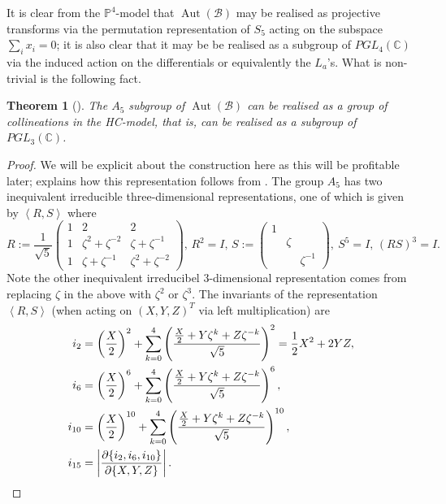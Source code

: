 \documentclass{amsart}
\newtheorem{theorem}{Theorem}[section]
\DeclareMathOperator{\Aut}{Aut}
\newcommand{\pround}[1]{\left( #1 \right)}
\newcommand{\pangle}[1]{\left\langle #1 \right\rangle}
\begin{document}
It is clear from the $\mathbb{P}^4$-model that $\Aut(\mathcal{B})$ may be realised as projective transforms via the permutation representation of $S_5$ acting on the subspace $\sum_i x_i = 0$; it is also clear that it may be  be realised as a subgroup of $PGL_4(\mathbb{C})$ via the induced action on the differentials or equivalently the $L_a$'s. What is non-trivial is the following fact.
\begin{theorem}[\cite{Dye1995}]\label{autA5}
The $A_5$ subgroup of $\Aut(\mathcal{B})$ can be realised as a group of collineations in the HC-model, that is, can be realised as a subgroup of $PGL_3(\mathbb{C})$.
\end{theorem}
\begin{proof}
We will be explicit about the construction here as this will be profitable later; \cite{Braden2012} explains how this representation follows from \cite{Dye1995}. The group $A_5$ has two inequivalent irreducible three-dimensional representations, one of which is given by $\pangle{R, S}$ where 
$$
R:=\frac1{\sqrt5}\begin{pmatrix}
    1 & 2                 & 2 \\
    1 & \zeta^2+\zeta^{-2}&\zeta+\zeta^{-1}  \\
    1 & \zeta+\zeta^{-1}  & \zeta^2+\zeta^{-2}
  \end{pmatrix}, \, {R}^2=I , \,  
  S:=\begin{pmatrix}1&&\\ &\zeta&\\ &&\zeta^{-1}\end{pmatrix},\  {S}^5=I, \,  (RS)^3=I  .
$$
Note the other inequivalent irreducibel 3-dimensional representation comes from replacing $\zeta$ in the above with $\zeta^2 $ or $\zeta^3$. The invariants of the representation $\pangle{R, S}$ (when acting on $(X,Y,Z)^T$ via left multiplication) are
\begin{align*}
i_2 &=\pround{\frac{X}{2}}^2+\sum_{k=0}\sp4\left(\frac{\frac{X}{2}+Y\zeta^k+Z\zeta^{-k}}{\sqrt{5}}\right)^2=\frac{1}{2}X^2+2YZ,\\
i_6 &=\pround{\frac{X}{2}}^6+\sum_{k=0}\sp4\left(\frac{\frac{X}{2}+Y\zeta^k+Z\zeta^{-k}}{\sqrt{5}}\right)^6,\\
i_{10} &=\pround{\frac{X}{2}}^{10}+\sum_{k=0}\sp4\left(\frac{\frac{X}{2}+Y\zeta^k+Z\zeta^{-k}}{\sqrt{5}}\right)^{10},\\
i_{15} &= \left \lvert\frac{\partial\{ i_2,i_{6},i_{10}\} }{\partial \{X,Y,Z\}} \right \rvert.
\end{align*}

\end{proof}
\end{document}
